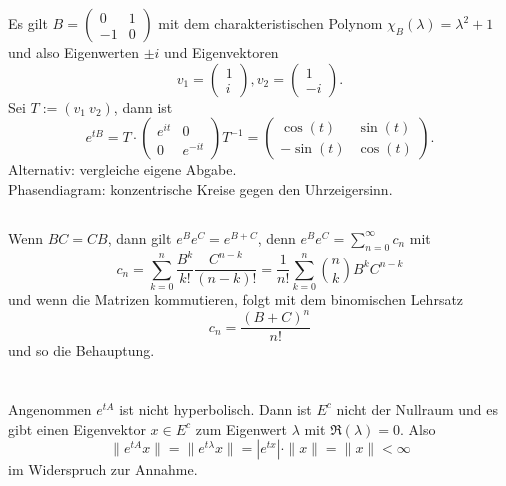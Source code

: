 \documentclass[a4paper]{article}
\begin{document}
\section{}
\subsection{}
Es gilt $B=\begin{pmatrix}
0 & 1 \\ - 1 & 0
\end{pmatrix}$ mit dem charakteristischen Polynom $χ_B(λ) = λ^2 + 1$ und also Eigenwerten $\pm i$ und Eigenvektoren
$$
v_1 = \begin{pmatrix}
1\\ i
\end{pmatrix}, v_2 = \begin{pmatrix}
1 \\ - i
\end{pmatrix}.
$$
Sei $T := (v_1 ~ v_2)$, dann ist
$$e^{tB} = T \cdot \begin{pmatrix}
e^{it} & 0\\ 0& e^{-it}
\end{pmatrix}T^{-1} = \begin{pmatrix} \cos(t) & \sin(t) \\ -\sin(t) & \cos(t) \end{pmatrix}.$$
Alternativ: vergleiche eigene Abgabe.\\
Phasendiagram: konzentrische Kreise gegen den Uhrzeigersinn.

\subsection{}
Wenn $BC = CB$, dann gilt $e^B e^C = e^{B+C}$, denn $e^B e^C = \sum_{n=0}^∞ c_n$ mit 
$$c_n = \sum_{k=0}^n \frac{B^k}{k!} \frac{C^{n-k}}{(n-k)!} = \frac{1}{n!} \sum_{k=0}^n \binom{n}{k} B^k C^{n-k}$$
und wenn die Matrizen kommutieren, folgt mit dem binomischen Lehrsatz
$$c_n = \frac{(B+C)^n}{n!}$$
und so die Behauptung.

\section{}
\subsection{}
Angenommen $e^{tA}$ ist nicht hyperbolisch. 
Dann ist $E^c$ nicht der Nullraum und es gibt einen Eigenvektor $x\in E^c$ zum Eigenwert $λ$ mit $\Re(λ) = 0$. Also
$$\| e^{tA}x \| = \| e^{tλ} x \| = |e^{tx}| \cdot \|x\|  = \| x\| < \infty $$
im Widerspruch zur Annahme.
\end{document}
